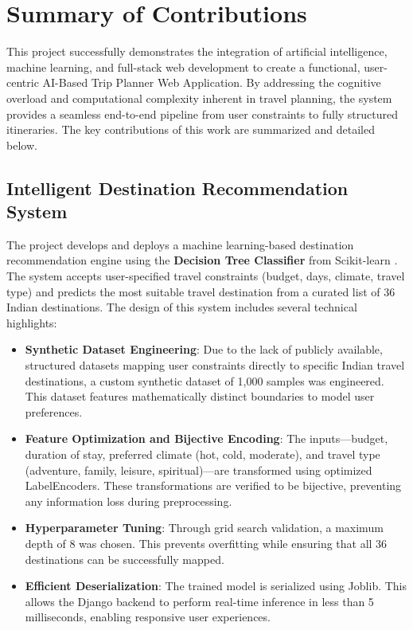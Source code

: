 \section{Summary of Contributions}

This project successfully demonstrates the integration of artificial intelligence, machine learning, and full-stack web development to create a functional, user-centric AI-Based Trip Planner Web Application. By addressing the cognitive overload and computational complexity inherent in travel planning, the system provides a seamless end-to-end pipeline from user constraints to fully structured itineraries. The key contributions of this work are summarized and detailed below.

\subsection{Intelligent Destination Recommendation System}

The project develops and deploys a machine learning-based destination recommendation engine using the \textbf{Decision Tree Classifier} from Scikit-learn \cite{pedregosa2011}. The system accepts user-specified travel constraints (budget, days, climate, travel type) and predicts the most suitable travel destination from a curated list of 36 Indian destinations.
The design of this system includes several technical highlights:
\begin{itemize}
    \item \textbf{Synthetic Dataset Engineering}: Due to the lack of publicly available, structured datasets mapping user constraints directly to specific Indian travel destinations, a custom synthetic dataset of 1,000 samples was engineered. This dataset features mathematically distinct boundaries to model user preferences.
    \item \textbf{Feature Optimization and Bijective Encoding}: The inputs—budget, duration of stay, preferred climate (hot, cold, moderate), and travel type (adventure, family, leisure, spiritual)—are transformed using optimized LabelEncoders. These transformations are verified to be bijective, preventing any information loss during preprocessing.
    \item \textbf{Hyperparameter Tuning}: Through grid search validation, a maximum depth of 8 was chosen. This prevents overfitting while ensuring that all 36 destinations can be successfully mapped.
    \item \textbf{Efficient Deserialization}: The trained model is serialized using Joblib. This allows the Django backend to perform real-time inference in less than 5 milliseconds, enabling responsive user experiences.
\end{itemize}

